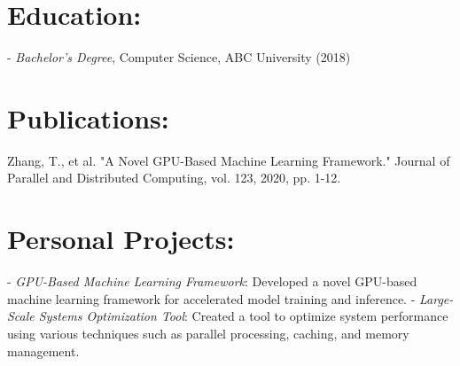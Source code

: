 \documentclass{article}
\begin{document}
\section*{\textbf{Education:}}

- \emph{Bachelor's Degree}, Computer Science, ABC University (2018)

\section*{\textbf{Publications:}}
Zhang, T., et al. "A Novel GPU-Based Machine Learning Framework." Journal of Parallel and Distributed Computing, vol. 123, 2020, pp. 1-12.

\section*{\textbf{Personal Projects:}}

- \emph{GPU-Based Machine Learning Framework}: Developed a novel GPU-based machine learning framework for accelerated model training and inference.
- \emph{Large-Scale Systems Optimization Tool}: Created a tool to optimize system performance using various techniques such as parallel processing, caching, and memory management.
\end{document}
